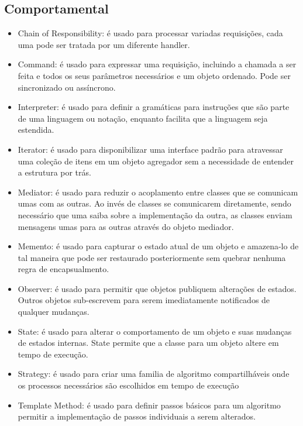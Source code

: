 \subsection{Comportamental}

\begin{itemize}
	\item Chain of Responsibility: é usado para processar variadas requisições, cada uma pode ser tratada por um diferente handler.
	\item Command: é usado para expressar uma requisição, incluindo a chamada a ser feita e todos os seus parâmetros necessários e um objeto ordenado. Pode ser sincronizado ou assíncrono. 
	\item Interpreter: é usado para definir a gramáticas para instruções que são parte de uma linguagem ou notação, enquanto facilita que a linguagem seja estendida.
	\item Iterator: é usado para disponibilizar uma interface padrão para atravessar uma coleção de itens em um objeto agregador sem a necessidade de entender a estrutura por trás.
	\item Mediator: é usado para reduzir o acoplamento entre classes que se comunicam umas com as outras. Ao invés de classes se comunicarem diretamente, sendo necessário que uma saiba sobre a implementação da outra, as classes enviam mensagens umas para as outras através do objeto mediador.
	\item Memento: é usado para capturar o estado atual de um objeto e amazena-lo de tal maneira que pode ser restaurado posteriormente sem quebrar nenhuma regra de encapsualmento. 
	\item Observer: é usado para permitir que objetos publiquem alterações de estados. Outros objetos sub-escrevem para serem imediatamente notificados de qualquer mudanças.
	\item State: é usado para alterar o comportamento de um objeto e suas mudanças de estados internas. State permite que a classe para um objeto altere em tempo de execução.
	\item Strategy: é usado para criar uma familia de algoritmo compartilháveis onde os processos necessários são escolhidos em tempo de execução
	\item Template Method: é usado para definir passos básicos para um algoritmo permitir a implementação de passos individuais a serem alterados.
\end{itemize}